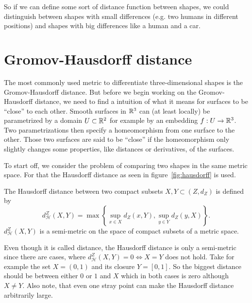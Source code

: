 So if we can define some sort of distance function between shapes, we could distinguish between shapes with small differences (e.g. two humans in different positions) and shapes with big differences like a human and a car.

\section{Gromov-Hausdorff distance}
The most commonly used metric to differentiate three-dimensional shapes is the Gromov-Hausdorff distance.
But before we begin working on the Gromov-Hausdorff distance, we need to find a intuition of what it means for surfaces to be ``close'' to each other.
Smooth surfaces in $\mathbb{R}^3$ can (at least locally) be parametrized by a domain $U \subset \mathbb{R}^2$ for example by an embedding $f: U\rightarrow \mathbb{R}^3$.
Two parametrizations then specify a homeomorphism from one surface to the other.
Those two surfaces are said to be ``close'' if the homeomorphism only slightly changes some properties, like distances or derivatives, of the surfaces.

To start off, we consider the problem of comparing two shapes in the same metric space.
For that the Hausdorff distance as seen in figure~\ref{fig:hausdorff} is used.
\begin{mydef}
	The Hausdorff distance between two compact subsets $X,Y \subset (Z,d_Z)$ is defined by
	$$d^Z_\mathcal{H}(X,Y) = \max \left\{ \sup_{x \in X} d_Z(x,Y), \sup_{y \in Y} d_Z(y,X)\right\}.$$
	$d^Z_\mathcal{H}(X,Y)$ is a semi-metric on the space of compact subsets of a metric space.
\end{mydef}
Even though it is called distance, the Hausdorff distance is only a semi-metric since there are cases, where $d^Z_\mathcal{H}(X,Y) = 0 \Leftrightarrow X = Y$ does not hold.
Take for example the set $X = (0,1)$ and its closure $Y = [0,1]$.
So the biggest distance should be between either $0$ or $1$ and $X$ which in both cases is zero although $X \neq Y$.
Also note, that even one stray point can make the Hausdorff distance arbitrarily large.

